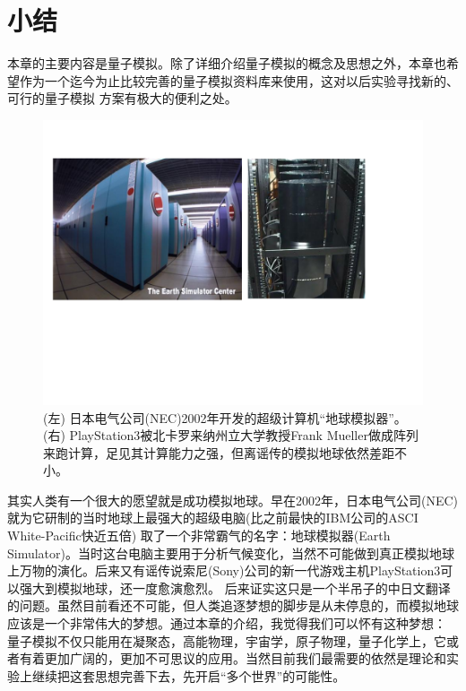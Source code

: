 \section{小结}

本章的主要内容是量子模拟。除了详细介绍量子模拟的概念及思想之外，本章也希望作为一个迄今为止比较完善的量子模拟资料库来使用，这对以后实验寻找新的、可行的量子模拟
方案有极大的便利之处。

\begin{figure}[htbp]
            \begin{center}
              \includegraphics[width= 0.8\columnwidth]{figures/nec.pdf}
              \caption{(左) 日本电气公司(NEC)2002年开发的超级计算机“地球模拟器”。(右) PlayStation3被北卡罗来纳州立大学教授Frank Mueller做成阵列来跑计算，足见其计算能力之强，但离谣传的模拟地球依然差距不小。
              }
              \label{nec}
            \end{center}
\end{figure}

其实人类有一个很大的愿望就是成功模拟地球。早在2002年，日本电气公司(NEC)就为它研制的当时地球上最强大的超级电脑(比之前最快的IBM公司的ASCI White-Pacific快近五倍) 取了一个非常霸气的名字：地球模拟器(Earth Simulator)。当时这台电脑主要用于分析气候变化，当然不可能做到真正模拟地球上万物的演化。后来又有谣传说索尼(Sony)公司的新一代游戏主机PlayStation3可以强大到模拟地球，还一度愈演愈烈。
后来证实这只是一个半吊子的中日文翻译的问题。虽然目前看还不可能，但人类追逐梦想的脚步是从未停息的，而模拟地球应该是一个非常伟大的梦想。通过本章的介绍，我觉得我们可以怀有这种梦想：
量子模拟不仅只能用在凝聚态，高能物理，宇宙学，原子物理，量子化学上，它或者有着更加广阔的，更加不可思议的应用。当然目前我们最需要的依然是理论和实验上继续把这套思想完善下去，先开启“多个世界”的可能性。 